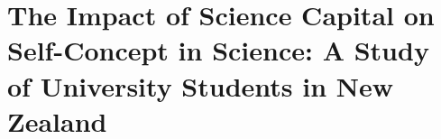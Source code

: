 \chapter[The Impact of Science Capital on Self-Concept in Science][]{The Impact of Science Capital on Self-Concept in Science: A Study of University Students in New Zealand}